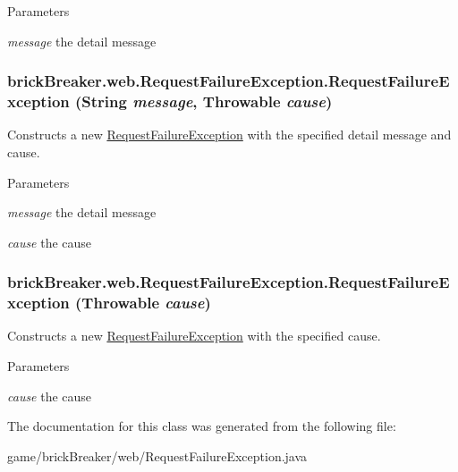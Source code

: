 \begin{DoxyParams}{Parameters}
\item[{\em message}]the detail message \end{DoxyParams}
\hypertarget{classbrick_breaker_1_1web_1_1_request_failure_exception_ab61c4dda3a1de78730729cd4b42d6863}{
\subsubsection[{RequestFailureException}]{\setlength{\rightskip}{0pt plus 5cm}brickBreaker.web.RequestFailureException.RequestFailureException (String {\em message}, \/  Throwable {\em cause})}}
\label{classbrick_breaker_1_1web_1_1_request_failure_exception_ab61c4dda3a1de78730729cd4b42d6863}
Constructs a new {\ttfamily \hyperlink{classbrick_breaker_1_1web_1_1_request_failure_exception}{RequestFailureException}} with the specified detail message and cause.


\begin{DoxyParams}{Parameters}
\item[{\em message}]the detail message \item[{\em cause}]the cause \end{DoxyParams}
\hypertarget{classbrick_breaker_1_1web_1_1_request_failure_exception_ab1b4d46e0cfbbe6a3402d6f1d733bd82}{
\subsubsection[{RequestFailureException}]{\setlength{\rightskip}{0pt plus 5cm}brickBreaker.web.RequestFailureException.RequestFailureException (Throwable {\em cause})}}
\label{classbrick_breaker_1_1web_1_1_request_failure_exception_ab1b4d46e0cfbbe6a3402d6f1d733bd82}
Constructs a new {\ttfamily \hyperlink{classbrick_breaker_1_1web_1_1_request_failure_exception}{RequestFailureException}} with the specified cause.


\begin{DoxyParams}{Parameters}
\item[{\em cause}]the cause \end{DoxyParams}


The documentation for this class was generated from the following file:\begin{DoxyCompactItemize}
\item 
game/brickBreaker/web/RequestFailureException.java\end{DoxyCompactItemize}
